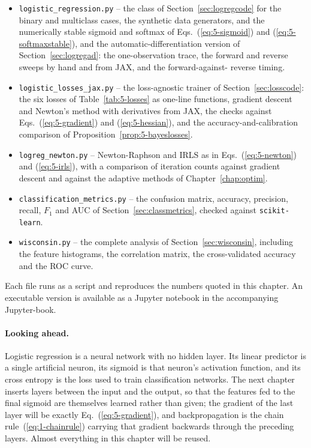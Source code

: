 \begin{itemize}
  \item \texttt{logistic\_regression.py} -- the class of
        Section~\ref{sec:logregcode} for the binary and multiclass cases, the
        synthetic data generators, and the numerically stable sigmoid and
        softmax of Eqs.~(\ref{eq:5-sigmoid}) and (\ref{eq:5-softmaxstable}),
        and the automatic-differentiation version of
        Section~\ref{sec:logregad}: the one-observation trace, the forward
        and reverse sweeps by hand and from JAX, and the forward-against-
        reverse timing.
  \item \texttt{logistic\_losses\_jax.py} -- the loss-agnostic trainer of
        Section~\ref{sec:losscode}: the six losses of Table~\ref{tab:5-losses}
        as one-line functions, gradient descent and Newton's method with
        derivatives from JAX, the checks against Eqs.~(\ref{eq:5-gradient})
        and (\ref{eq:5-hessian}), and the accuracy-and-calibration
        comparison of Proposition~\ref{prop:5-bayeslosses}.
  \item \texttt{logreg\_newton.py} -- Newton-Raphson and IRLS as in
        Eqs.~(\ref{eq:5-newton}) and (\ref{eq:5-irls}), with a comparison of
        iteration counts against gradient descent and against the adaptive
        methods of Chapter~\ref{chap:optim}.
  \item \texttt{classification\_metrics.py} -- the confusion matrix, accuracy,
        precision, recall, $F_1$ and AUC of Section~\ref{sec:classmetrics},
        checked against \texttt{scikit-learn}.
  \item \texttt{wisconsin.py} -- the complete analysis of
        Section~\ref{sec:wisconsin}, including the feature histograms, the
        correlation matrix, the cross-validated accuracy and the ROC curve.
\end{itemize}

Each file runs as a script and reproduces the numbers quoted in this chapter.
An executable version is available as a Jupyter notebook in the accompanying
Jupyter-book.

\paragraph{Looking ahead.}
Logistic regression is a neural network with no hidden layer.  Its linear
predictor is a single artificial neuron, its sigmoid is that neuron's
activation function, and its cross entropy is the loss used to train
classification networks.  The next chapter inserts layers between the input and
the output, so that the features fed to the final sigmoid are themselves
learned rather than given; the gradient of the last layer will be exactly
Eq.~(\ref{eq:5-gradient}), and backpropagation is the chain
rule~(\ref{eq:1-chainrule}) carrying that gradient backwards through the
preceding layers.  Almost everything in this chapter will be reused.

